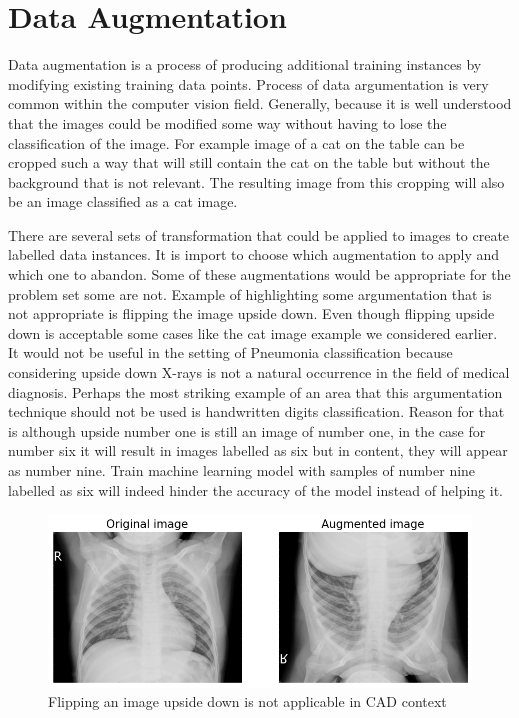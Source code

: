 \section{Data Augmentation} \label{sec:dataaug}
Data augmentation is a process of producing additional training instances by modifying existing training data points.
Process of data argumentation is very common within the computer vision field.
Generally, because it is well understood that the images could be modified some way without having to lose the classification of the image.
For example image of a cat on the table can be cropped such a way that will still contain the cat on the table but without the background that is not relevant.
The resulting image from this cropping will also be an image classified as a cat image.

There are several sets of transformation that could be applied to images to create labelled data instances. 
It is import to choose which augmentation to apply and which one to abandon.
Some of these augmentations would be appropriate for the problem set some are not.
Example of highlighting some argumentation that is not appropriate is flipping the image upside down. 
Even though flipping upside down is acceptable some cases like the cat image example we considered earlier. 
It would not be useful in the setting of Pneumonia classification because considering upside down X-rays is not a natural occurrence in the field of medical diagnosis.
Perhaps the most striking example of an area that this argumentation technique should not be used is handwritten digits classification. 
Reason for that is although upside number one is still an image of number one, in the case for number six it will result in images labelled as six but in content, they will appear as number nine. 
Train machine learning model with samples of number nine labelled as six will indeed hinder the accuracy of the model instead of helping it.

\begin{figure}[H]
    \centering
    \includegraphics[width=\textwidth]{img/augmented-image-1588951790.png}
    \caption{Flipping an image upside down is not applicable in CAD context}
    \label{fig:upsidedownxray}
  \end{figure}

